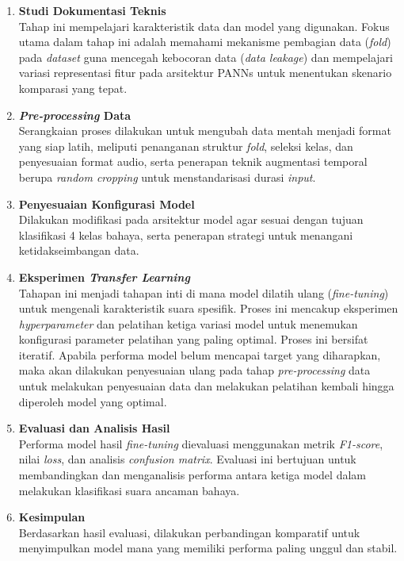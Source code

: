\begin{enumerate}
    \item \textbf{Studi Dokumentasi Teknis} \\
    Tahap ini mempelajari karakteristik data dan model yang digunakan.
    Fokus utama dalam tahap ini adalah memahami mekanisme pembagian data (\textit{fold}) pada \textit{dataset} guna mencegah kebocoran data (\textit{data leakage}) dan mempelajari variasi representasi fitur pada arsitektur PANNs untuk menentukan skenario komparasi yang tepat.

    \newpage
    
    \item \textbf{\textit{Pre-processing} Data} \\
    Serangkaian proses dilakukan untuk mengubah data mentah menjadi format yang siap latih, meliputi penanganan struktur \textit{fold}, seleksi kelas, dan penyesuaian format audio, serta penerapan teknik augmentasi temporal berupa \textit{random cropping} untuk menstandarisasi durasi \textit{input}.

    \item \textbf{Penyesuaian Konfigurasi Model} \\
    Dilakukan modifikasi pada arsitektur model agar sesuai dengan tujuan klasifikasi 4 kelas bahaya, serta penerapan strategi untuk menangani ketidakseimbangan data.

    \item \textbf{Eksperimen \textit{Transfer Learning}} \\
    Tahapan ini menjadi tahapan inti di mana model dilatih ulang (\textit{fine-tuning}) untuk mengenali karakteristik suara spesifik. Proses ini mencakup eksperimen \textit{hyperparameter} dan pelatihan ketiga variasi model untuk menemukan konfigurasi parameter pelatihan yang paling optimal.
    Proses ini bersifat iteratif. Apabila performa model belum mencapai target yang diharapkan, maka akan dilakukan penyesuaian ulang pada tahap \textit{pre-processing} data untuk melakukan penyesuaian data dan melakukan pelatihan kembali hingga diperoleh model yang optimal.

    \item \textbf{Evaluasi dan Analisis Hasil} \\
    Performa model hasil \textit{fine-tuning} dievaluasi menggunakan metrik \textit{F1-score}, nilai \textit{loss}, dan analisis \textit{confusion matrix}.
    Evaluasi ini bertujuan untuk membandingkan dan menganalisis performa antara ketiga model dalam melakukan klasifikasi suara ancaman bahaya.

    \item \textbf{Kesimpulan} \\
    Berdasarkan hasil evaluasi, dilakukan perbandingan komparatif untuk menyimpulkan model mana yang memiliki performa paling unggul dan stabil.
\end{enumerate}

